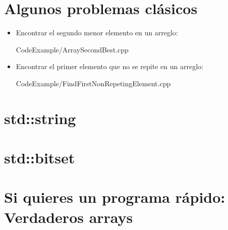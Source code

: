 \documentclass[12pt, fleqn]{report}                             %
\theoremstyle{break}                                            %
\begin{document}
        
        \clearpage
        \section{Algunos problemas clásicos}

            \begin{itemize}
                \item 
                    Encontrar el segundo menor elemento en un arreglo:
                    
                    {CodeExample/ArraySecondBest.cpp}

                \item 
                    Encontrar el primer elemento que no se repite en un
                    arreglo:
                    
                    {CodeExample/FindFirstNonRepetingElement.cpp}
            \end{itemize}
               
        \section{std::string}

        \section{std::bitset}


        \clearpage
        \section{Si quieres un programa rápido: Verdaderos arrays} 
        
\end{document}
